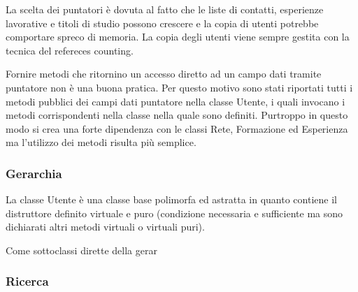 \documentclass[a4paper,openany]{article}
\begin{document}
La scelta dei puntatori è dovuta al fatto che le liste di contatti, esperienze lavorative e titoli di studio possono crescere e la copia di utenti potrebbe comportare spreco di memoria. La copia degli utenti viene sempre gestita con la tecnica del refereces counting.

Fornire metodi che ritornino un accesso diretto ad un campo dati tramite puntatore non è una buona pratica. Per questo motivo sono stati riportati tutti i metodi pubblici dei campi dati puntatore nella classe Utente, i quali invocano i metodi corrispondenti nella classe nella quale sono definiti. Purtroppo in questo modo si crea una forte dipendenza con le classi Rete, Formazione ed Esperienza ma l'utilizzo dei metodi risulta più semplice.

\subsubsection*{Gerarchia}
La classe Utente è una classe base polimorfa ed astratta in quanto contiene il distruttore definito virtuale e puro (condizione necessaria e sufficiente ma sono dichiarati altri metodi virtuali o virtuali puri).

Come sottoclassi dirette della gerar

\subsubsection*{Ricerca}
\end{document}
